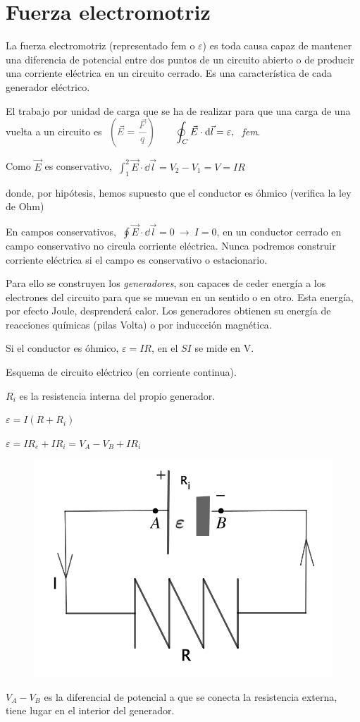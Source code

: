 \section{Fuerza electromotriz}


La fuerza electromotriz (representado fem o $\varepsilon$)
es toda causa capaz de mantener una diferencia de potencial entre dos puntos de un circuito abierto o de producir una corriente eléctrica en un circuito cerrado. Es una característica de cada generador eléctrico.

El trabajo por unidad de carga que se ha de realizar para que una carga de una vuelta a un circuito es
$\ \textcolor{gris}{\left( \vec E = \dfrac {\vec F}{q} \right)} \qquad \displaystyle
\oint_C \vec E \cdot \dd \vec l = \varepsilon,\ $ \emph{fem}.

Como $\vec E$ es conservativo, $\ \displaystyle \int_1^2 \vec E \cdot \dd \vec l = V_2-V_1=V=IR$

donde, por hipótesis, hemos supuesto que el conductor es óhmico (verifica la ley de Ohm)

En campos conservativos, $\ \displaystyle \oint \vec E \cdot \dd \vec l =0 \ \to \ I=0$, en un conductor cerrado en campo conservativo no circula corriente eléctrica. Nunca podremos construir corriente eléctrica si el campo es conservativo o estacionario.

Para ello se construyen los \emph{generadores}, son capaces de ceder energía a los electrones del circuito para que se muevan en un sentido o en otro. Esta energía, por efecto Joule, desprenderá calor. Los generadores obtienen su energía de reacciones químicas (pilas Volta) o por induccción magnética.

Si el conductor es óhmico, $\varepsilon=IR$, en el $SI$ se mide en $\mathrm{V}$.

\begin{multicols}{2}
Esquema de circuito eléctrico (en corriente continua).

$R_i$ es la resistencia interna del propio generador.

$\varepsilon=I(R+R_i)$

$\varepsilon=IR_e+IR_i=V_A-V_B+IR_i$
	\begin{figure}[H]
	\centering
	\includegraphics[width=.5\textwidth]{imagenes/imagenes25/T25IM05.png}
\end{figure}
\end{multicols}
$V_A-V_B$ es la diferencial de potencial a que se conecta la resistencia externa, tiene lugar en el interior del generador.

